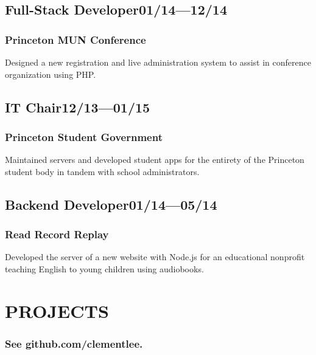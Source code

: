 \documentclass[11pt]{article}
\begin{document}
\begin{multicols}{2}
\subsection*{Full-Stack Developer\hfill\textnormal{01/14---12/14}}
\subsubsection*{Princeton MUN Conference}
Designed a new registration and live administration system to assist in conference organization using PHP.

\subsection*{IT Chair\hfill\textnormal{12/13---01/15}}
\subsubsection*{Princeton Student Government}
Maintained servers and developed student apps for the entirety of the Princeton student body in tandem with school administrators.

\subsection*{Backend Developer\hfill\textnormal{01/14---05/14}}
\subsubsection*{Read Record Replay}
Developed the server of a new website with Node.js for an educational nonprofit teaching English to young children using audiobooks.

\section*{PROJECTS}
\vspace{-0.5\baselineskip}
\subsubsection*{See github.com/clementlee.}

\vspace{2\baselineskip}



\end{multicols}
\end{document}
